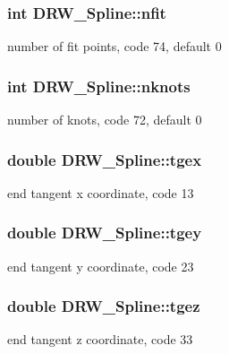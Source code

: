 \subsubsection[{nfit}]{\setlength{\rightskip}{0pt plus 5cm}int D\+R\+W\+\_\+\+Spline\+::nfit}\label{class_d_r_w___spline_aa9269fcfa581a0e0b25a84fb8dddc96c}
number of fit points, code 74, default 0 \hypertarget{class_d_r_w___spline_a5dd173d8176de55d07f00d96dedb0201}{}
\subsubsection[{nknots}]{\setlength{\rightskip}{0pt plus 5cm}int D\+R\+W\+\_\+\+Spline\+::nknots}\label{class_d_r_w___spline_a5dd173d8176de55d07f00d96dedb0201}
number of knots, code 72, default 0 \hypertarget{class_d_r_w___spline_ae6195201183d629d458d820417587197}{}
\subsubsection[{tgex}]{\setlength{\rightskip}{0pt plus 5cm}double D\+R\+W\+\_\+\+Spline\+::tgex}\label{class_d_r_w___spline_ae6195201183d629d458d820417587197}
end tangent x coordinate, code 13 \hypertarget{class_d_r_w___spline_a5bbb13c6219350335c353b86755adcea}{}
\subsubsection[{tgey}]{\setlength{\rightskip}{0pt plus 5cm}double D\+R\+W\+\_\+\+Spline\+::tgey}\label{class_d_r_w___spline_a5bbb13c6219350335c353b86755adcea}
end tangent y coordinate, code 23 \hypertarget{class_d_r_w___spline_acfe280748cc843881dffd17430a2be37}{}
\subsubsection[{tgez}]{\setlength{\rightskip}{0pt plus 5cm}double D\+R\+W\+\_\+\+Spline\+::tgez}\label{class_d_r_w___spline_acfe280748cc843881dffd17430a2be37}
end tangent z coordinate, code 33 \hypertarget{class_d_r_w___spline_af669678833d9334001f372ef3e459063}{}
